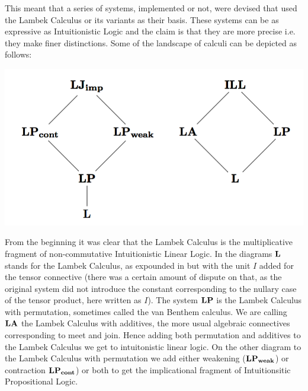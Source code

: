 \documentclass{llncs}
\begin{document}

This meant that a series of systems, implemented or not, were devised
that used the Lambek Calculus or its variants as their basis. These
systems can be as expressive as Intuitionistic Logic and the claim is
that they are more precise i.e. they make finer distinctions. Some of
the landscape of calculi can be depicted as follows:
\begin{center}
  \includegraphics[scale=0.30]{logic-diag}
\end{center}




From the beginning it was clear that the Lambek Calculus is the
multiplicative fragment of non-commutative Intuitionistic Linear
Logic. In the diagrams $\bf L$ stands for the Lambek Calculus, as
expounded in \cite{Lambek1958} but with the unit $I$ added for the
tensor connective (there was a certain amount of dispute on that, as
the original system did not introduce the constant corresponding to
the nullary case of the tensor product, here written as $I$). The
system $\bf{LP}$ is the Lambek Calculus with permutation, sometimes
called the van Benthem calculus. We are calling $\bf{LA}$ the Lambek
Calculus with additives, the more usual algebraic connectives
corresponding to meet and join. Hence adding both permutation and
additives to the Lambek Calculus we get to intuitonistic linear
logic. On the other diagram to the Lambek Calculus with permutation we
add either weakening ($\bf{LP_{weak}}$) or contraction
$\bf{LP_{cont}}$) or both to get the implicational fragment of
Intuitionsitic Propositional Logic.
\end{document}
